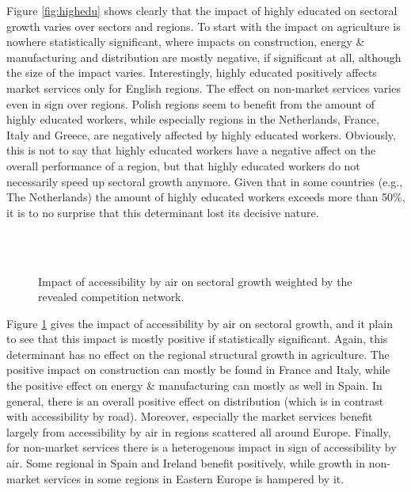 \documentclass[11pt,parskip,abstracton,notitlepage, paper=a4]{scrartcl}
\begin{document}
Figure \ref{fig:highedu} shows clearly that the impact of highly educated on sectoral growth varies over sectors and regions. To start with the impact on agriculture is nowhere statistically significant, where impacts on construction, energy \& manufacturing and distribution are mostly negative, if significant at all, although the size of the impact varies. Interestingly, highly educated positively affects market services only for English regions. The effect on non-market services varies even in sign over regions. Polish regions seem to benefit from the amount of highly educated workers, while especially regions in the Netherlands, France, Italy and Greece, are negatively affected by highly educated workers. Obviously, this is not to say that highly educated workers have a negative affect on the overall performance of a region, but that highly educated workers do not necessarily speed up sectoral growth anymore. Given that in some countries (e.g., The Netherlands) the amount of highly educated workers exceeds more than 50\%, it is to no surprise that this determinant lost its decisive nature.

\begin{figure}
\centering
{}
\\
\\
\caption{Impact of accessibility by air on sectoral growth weighted by the revealed competition network.}
\label{fig:bblucht}
\end{figure}

Figure \ref{fig:bblucht} gives the impact of accessibility by air on sectoral growth, and it plain to see that this impact is mostly positive if statistically significant. Again, this determinant has no effect on the regional structural growth in agriculture. The positive impact on construction can mostly be found in France and Italy, while the positive effect on energy \& manufacturing can mostly as well in Spain. In general, there is an overall positive effect on distribution (which is in contrast with accessibility by road). Moreover, especially the market services benefit largely from accessibility by air in regions scattered all around Europe. Finally, for non-market services there is a heterogenous impact in sign of accessibility by air. Some regional in Spain and Ireland benefit positively, while growth in non-market services in some regions in Eastern Europe is hampered by it. 
\end{document}

